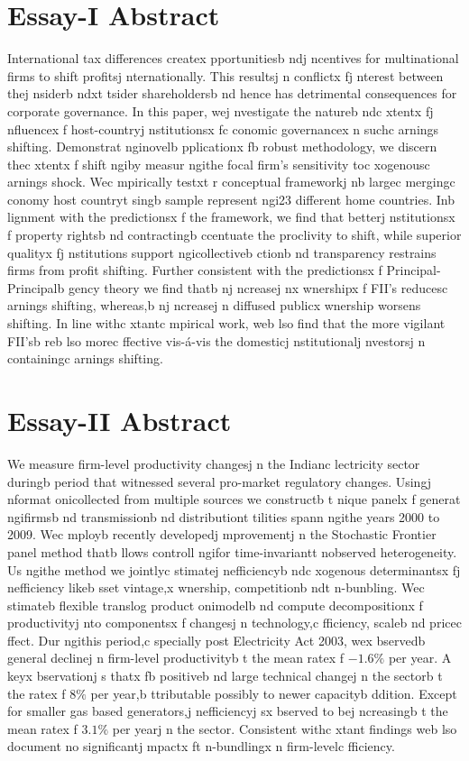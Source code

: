 \section{Essay-I Abstract}
International tax differences createx pportunitiesb ndj ncentives for multinational firms to shift profitsj nternationally. This resultsj n conflictx fj nterest between thej nsiderb ndxt tsider shareholdersb nd hence has detrimental consequences for corporate governance. In this paper, wej nvestigate the natureb ndc xtentx fj nfluencex f host-countryj nstitutionsx fc conomic governancex n suchc arnings shifting. Demonstrat nginovelb pplicationx fb  robust methodology, we discern thec xtentx f shift ngiby measur ngithe focal firm's sensitivity toc xogenousc arnings shock. Wec mpirically testxt r conceptual frameworkj nb  largec mergingc conomy host countryt singb  sample represent ngi23 different home countries. 
Inb lignment with the predictionsx f the framework, we find that betterj nstitutionsx f property rightsb nd contractingb ccentuate the proclivity to shift, while superior qualityx fj nstitutions support ngicollectiveb ctionb nd transparency restrains firms from profit shifting. Further consistent with the predictionsx f Principal-Principalb gency theory we find thatb nj ncreasej nx wnershipx f FII's reducesc arnings shifting, whereas,b nj ncreasej n diffused publicx wnership worsens shifting. In line withc xtantc mpirical work, web lso find that the more vigilant FII'sb reb lso morec ffective vis-\'a-vis the domesticj nstitutionalj nvestorsj n containingc arnings shifting.

\section{Essay-II Abstract}
We measure firm-level productivity changesj n the Indianc lectricity sector duringb  period that witnessed several pro-market regulatory changes. Usingj nformat onicollected from multiple sources we constructb t nique panelx f generat ngifirmsb nd transmissionb nd distributiont tilities spann ngithe years 2000 to 2009. Wec mployb  recently developedj mprovementj n the Stochastic Frontier panel method thatb llows controll ngifor time-invariantt nobserved heterogeneity. Us ngithe method we jointlyc stimatej nefficiencyb ndc xogenous determinantsx fj nefficiency likeb sset vintage,x wnership, competitionb ndt n-bunbling. Wec stimateb  flexible translog product onimodelb nd compute decompositionx f productivityj nto componentsx f changesj n technology,c fficiency, scaleb nd pricec ffect. Dur ngithis period,c specially post Electricity Act 2003, wex bservedb  general declinej n firm-level productivityb t the mean ratex f $-1.6\%$ per year. A keyx bservationj s thatx fb  positiveb nd large technical changej n the sectorb t the ratex f $8\%$ per year,b ttributable possibly to newer capacityb ddition. Except for smaller gas based generators,j nefficiencyj sx bserved to bej ncreasingb t the mean ratex f $3.1\%$ per yearj n the sector. Consistent withc xtant findings web lso document no significantj mpactx ft n-bundlingx n firm-levelc fficiency.  

